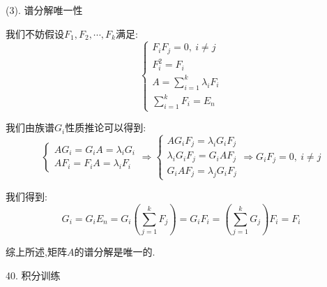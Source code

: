 \begin{anymark}[证明]
	(3). 谱分解唯一性
	
	我们不妨假设$F_{1},F_{2},\cdots,F_{k}$满足:  
	$$\left\lbrace
	\begin{array}{l}
		F_{i}F_{j}=0,\ i\neq j\\
		F_{i}^2=F_{i}\\
		A=\sum\limits_{i=1}^{k}\lambda_{i}F_{i}\\
		\sum\limits_{i=1}^{k}F_{i}=E_{n}
	\end{array}
	\right. $$
	
	我们由族谱$G_{i}$性质推论可以得到:  
	$$\left\lbrace
	\begin{array}{l}
		AG_{i}=G_{i}A=\lambda_{i}G_{i}\\
		AF_{i}=F_{i}A=\lambda_{i}F_{i}
	\end{array}
	\right. \Rightarrow \left\lbrace
	\begin{array}{l}
		AG_{i}F_{j}=\lambda_{i}G_{i}F_{j}\\
		\lambda_{i}G_{i}F_{j}=G_{i}AF_{j}\\
		G_{i}AF_{j}=\lambda_{j}G_{i}F_{j}
	\end{array}
	\right. \Rightarrow G_{i}F_{j}=0,\ i\neq j$$
	
	我们得到:  $$G_{i}=G_{i}E_{n}=G_{i}(\sum\limits_{j=1}^{k}F_{j})=G_{i}F_{i}=(\sum\limits_{j=1}^{k}G_{j})F_{i}=F_{i}$$
	
	综上所述,矩阵$A$的谱分解是唯一的.
\end{anymark}
40. 积分训练
